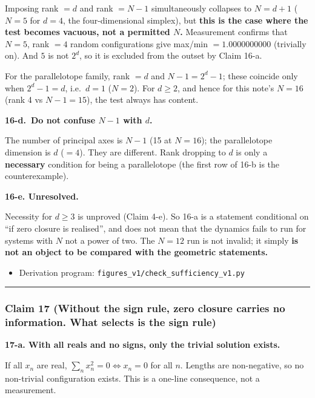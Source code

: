 \documentclass[
  10pt,
]{article}
\providecommand{\tightlist}{%
  \setlength{\itemsep}{0pt}\setlength{\parskip}{0pt}}
\begin{document}
Imposing rank \(=d\) and rank \(=N-1\) simultaneously collapses to
\(N=d+1\) (\(N=5\) for \(d=4\), the four-dimensional simplex), but
\textbf{this is the case where the test becomes vacuous, not a permitted
\(N\).} Measurement confirms that \(N=5\), rank \(=4\) random
configurations give max/min \(=1.0000000000\) (trivially on). And \(5\)
is not \(2^d\), so it is excluded from the outset by Claim 16-a.

For the parallelotope family, rank \(=d\) and \(N-1 = 2^d-1\); these
coincide only when \(2^d-1 = d\), i.e.~\(d=1\) (\(N=2\)). For \(d\ge2\),
and hence for this note's \(N=16\) (rank 4 vs \(N-1=15\)), the test
always has content.

\textbf{16-d.~Do not confuse \(N-1\) with \(d\).}

The number of principal axes is \(N-1\) (15 at \(N=16\)); the
parallelotope dimension is \(d\) (\(=4\)). They are different. Rank
dropping to \(d\) is only a \textbf{necessary} condition for being a
parallelotope (the first row of 16-b is the counterexample).

\textbf{16-e. Unresolved.}

Necessity for \(d\ge3\) is unproved (Claim 4-e). So 16-a is a statement
conditional on ``if zero closure is realised'', and does not mean that
the dynamics fails to run for systems with \(N\) not a power of two. The
\(N=12\) run is not invalid; it simply \textbf{is not an object to be
compared with the geometric statements.}

\begin{itemize}
\tightlist
\item
  Derivation program: \texttt{figures\_v1/check\_sufficiency\_v1.py}
\end{itemize}

\begin{center}\rule{0.5\linewidth}{0.5pt}\end{center}

\subsubsection{Claim 17 (Without the sign rule, zero closure carries no
information. What selects is the sign
rule)}\label{claim-17-without-the-sign-rule-zero-closure-carries-no-information.-what-selects-is-the-sign-rule}

\textbf{17-a. With all reals and no signs, only the trivial solution
exists.}

If all \(x_n\) are real, \(\sum_n x_n^2 = 0 \Leftrightarrow x_n=0\) for
all \(n\). Lengths are non-negative, so no non-trivial configuration
exists. This is a one-line consequence, not a measurement.
\end{document}
